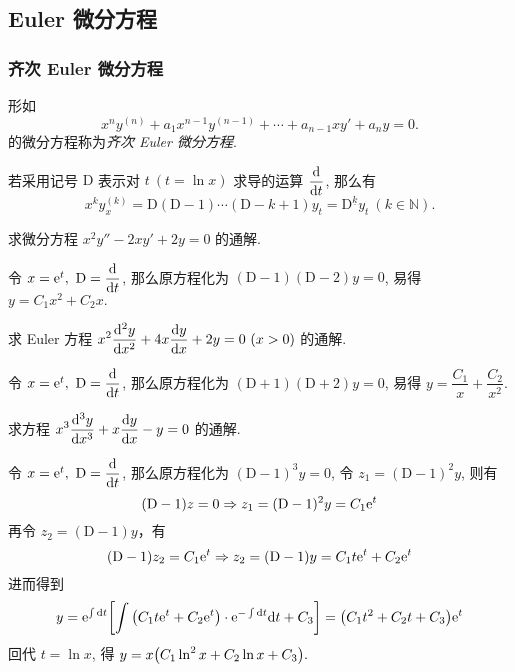 \subsection{Euler 微分方程}

\subsubsection{齐次 Euler 微分方程}

\begin{definition}
    形如 $$x^ny^{(n)}+a_1x^{n-1}y^{(n-1)}+\cdots+a_{n-1}xy'+a_ny=0.$$
    的微分方程称为\textit{齐次 Euler 微分方程}.
\end{definition}

\begin{theorem}
    若采用记号 $\mathrm{D}$ 表示对 $t~(t=\ln x)$ 求导的运算 $\displaystyle\dv{t}$, 那么有
    $$x^ky_{x}^{(k)}=\mathrm{D}(\mathrm{D}-1)\cdots(\mathrm{D}-k+1)y_{t}=\mathrm{D}^{\underline{k}}y_{t}~(k\in \mathbb{N}).$$
\end{theorem}

\begin{example}
    \label{x2y2xy2y0}求微分方程 $x^2y''-2xy'+2y=0$ 的通解.
\end{example}
\begin{solution}
    令 $x=\mathrm{e} ^t,~\mathrm{D}=\displaystyle\dv{t}$, 那么原方程化为 $(\mathrm{D}-1)(\mathrm{D}-2)y=0$, 易得 $y=C_1x^2+C_2x.$
\end{solution}

\begin{example}
    求 Euler 方程 $\displaystyle x^2\dv[2]{y}{x}+4x\dv{y}{x}+2y=0~(x>0)$ 的通解.
\end{example}
\begin{solution}
    令 $x=\mathrm{e} ^t,~\mathrm{D}=\displaystyle\dv{t}$, 那么原方程化为 $(\mathrm{D}+1)(\mathrm{D}+2)y=0$, 易得 $y=\dfrac{C_1}{x}+\dfrac{C_2}{x^2}.$
\end{solution}

\begin{example}
    求方程 $\displaystyle x^3\dv[3]{y}{x}+x\dv{y}{x}-y=0$ 的通解.
\end{example}
\begin{solution}
    令 $x=\mathrm{e} ^t,~\mathrm{D}=\displaystyle\dv{t}$, 那么原方程化为 $(\mathrm{D}-1)^3y=0$, 令 $z_1=(\mathrm{D}-1)^2y$, 则有
    $$
    (\mathrm{D}-1)z=0\Rightarrow z_1=(\mathrm{D}-1)^2y=C_1\mathrm{e} ^{t}
    $$
    再令 $z_2=(\mathrm{D}-1)y$，有 $$(\mathrm{D}-1)z_{2}=C_1\mathrm{e} ^{t}\Rightarrow z_2=(\mathrm{D}-1)y=C_1t\mathrm{e} ^{t}+C_2\mathrm{e} ^{t}$$
    进而得到 $$y=\mathrm{e} ^{\int \dd t}\qty[\int\qty(C_1t \mathrm{e} ^{t}+C_2\mathrm{e} ^{t})\cdot \mathrm{e} ^{-\int \dd  t}\dd  t+C_3]=\qty(C_1t^2+C_2t+C_3)\mathrm{e} ^{t}$$ 回代 $t=\ln x$, 得 $y=x\qty(C_1\ln^2x+C_2\ln x+C_3).$
\end{solution}

